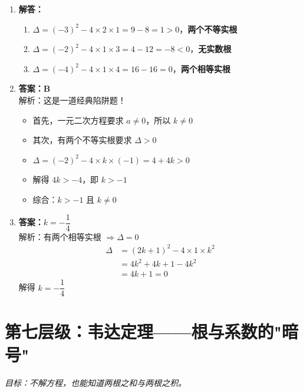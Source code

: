 \documentclass[12pt, a4paper]{article}
\begin{document}
\begin{answerbox}
    \begin{enumerate}
        \item \textbf{解答：}
        \begin{enumerate}
            \item[(1)] $\Delta = (-3)^2 - 4 \times 2 \times 1 = 9 - 8 = 1 > 0$，\textbf{两个不等实根}
            \item[(2)] $\Delta = (-2)^2 - 4 \times 1 \times 3 = 4 - 12 = -8 < 0$，\textbf{无实数根}
            \item[(3)] $\Delta = (-4)^2 - 4 \times 1 \times 4 = 16 - 16 = 0$，\textbf{两个相等实根}
        \end{enumerate}
        
        \item \textbf{答案：B} \\
        解析：这是一道经典陷阱题！
        \begin{itemize}
            \item 首先，一元二次方程要求 $a \neq 0$，所以 $k \neq 0$
            \item 其次，有两个不等实根要求 $\Delta > 0$
            \item $\Delta = (-2)^2 - 4 \times k \times (-1) = 4 + 4k > 0$
            \item 解得 $4k > -4$，即 $k > -1$
            \item 综合：$k > -1$ 且 $k \neq 0$
        \end{itemize}
        
        \item \textbf{答案：$k = -\dfrac{1}{4}$} \\
        解析：有两个相等实根 $\Rightarrow \Delta = 0$
        \begin{align*}
            \Delta &= (2k+1)^2 - 4 \times 1 \times k^2 \\
            &= 4k^2 + 4k + 1 - 4k^2 \\
            &= 4k + 1 = 0
        \end{align*}
        解得 $k = -\dfrac{1}{4}$
    \end{enumerate}
\end{answerbox}

\section{第七层级：韦达定理——根与系数的"暗号"}
\textit{目标：不解方程，也能知道两根之和与两根之积。}
\end{document}

